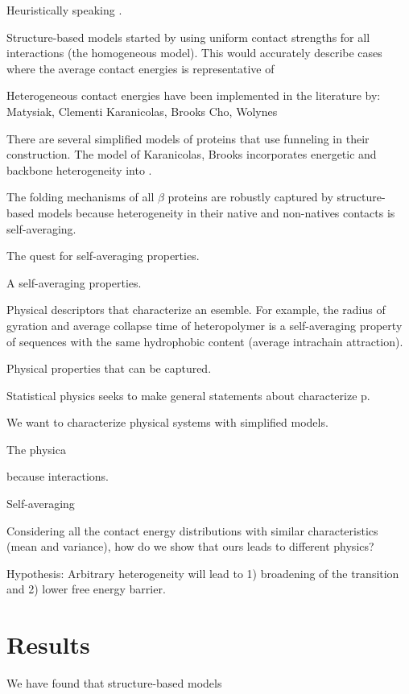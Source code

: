 \documentclass[preprint]{elsarticle}
\begin{document}
\cite{Clementi2000}
\cite{Matysiak2004}
\cite{Matysiak2006}
\cite{Cho2009a}

Heuristically speaking .

Structure-based models started by using uniform contact strengths for all 
interactions (the homogeneous model). This would accurately describe cases
where the average contact energies is representative of 

\cite{Cho2009a}

Heterogeneous contact energies have been implemented in the literature by:
Matysiak, Clementi
Karanicolas, Brooks
Cho, Wolynes

    There are several simplified models of proteins that use funneling in their
construction. The model of Karanicolas, Brooks incorporates energetic and
backbone heterogeneity into . 

The folding mechanisms of all $\beta$ proteins are robustly captured by
structure-based models because heterogeneity in their native and non-natives
contacts is self-averaging. 

The quest for self-averaging properties.

A self-averaging properties.

Physical descriptors that characterize an esemble. For example, the radius of
gyration and average collapse time of heteropolymer is a self-averaging
property of sequences with the same hydrophobic content (average intrachain
attraction). 

Physical properties that can be captured.

Statistical physics seeks to make general statements about characterize p.

We want to characterize physical systems with simplified models.

The physica

because interactions.

Self-averaging

Considering all the contact energy distributions with similar characteristics
(mean and variance), how do we show that ours leads to different physics?

Hypothesis: Arbitrary heterogeneity will lead to 1) broadening of the
transition and 2) lower free energy barrier.
\cite{Plotkin2002a}
\cite{Oztop2004}

\section{Results}
We have found that structure-based models
\end{document}
